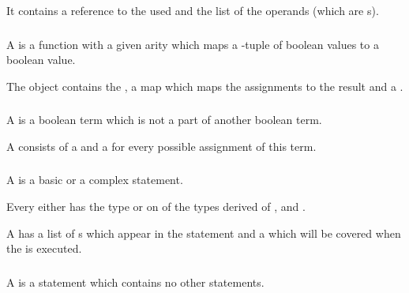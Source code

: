 It contains a reference to the  used and the list of the
operands (which are s).

\subsubsection[BooleanOperator]{}

A  is a function with a given arity  which maps
a -tuple of boolean values to a boolean value.

The object contains the , a map which maps the assignments to the
result and a .

\subsubsection[RootTerm]{}

A  is a boolean term which is not a part of another boolean term.

A  consists of a  and a 
for every possible assignment of this term.

\subsubsection[Statement]{}

A  is a basic or a complex statement.

Every  either has the type  or on of
the types derived of ,  and
.

A  has a list of s which appear in the statement
and a  which will be covered when the 
is executed.

\subsubsection[BasicStatement]{}

A  is a statement which contains no other statements.

\subsubsection[ComplexStatement]{}


